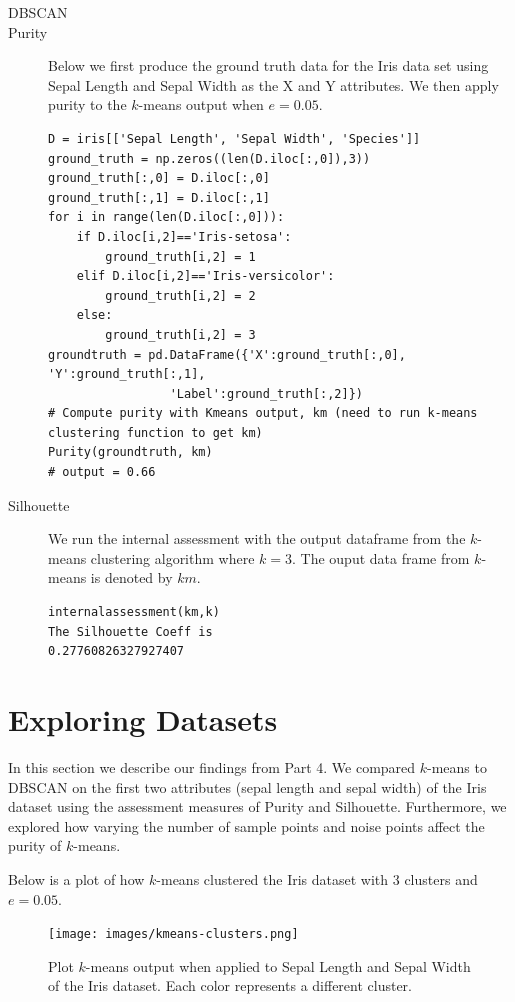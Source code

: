 \documentclass[psamsfonts,onesided,10pt]{amsart}
\begin{document}
\begin{description}
\item[DBSCAN] \todo{}
\item[Purity] Below we first produce the ground truth data for the Iris data set using Sepal Length 
and Sepal Width as the X and Y attributes. We then apply purity to the $k$-means output when $e=0.05$. 
\begin{verbatim}
D = iris[['Sepal Length', 'Sepal Width', 'Species']]
ground_truth = np.zeros((len(D.iloc[:,0]),3))
ground_truth[:,0] = D.iloc[:,0]
ground_truth[:,1] = D.iloc[:,1]
for i in range(len(D.iloc[:,0])):
    if D.iloc[i,2]=='Iris-setosa':
        ground_truth[i,2] = 1
    elif D.iloc[i,2]=='Iris-versicolor':
        ground_truth[i,2] = 2
    else:
        ground_truth[i,2] = 3
groundtruth = pd.DataFrame({'X':ground_truth[:,0], 'Y':ground_truth[:,1], 
                 'Label':ground_truth[:,2]})       
# Compute purity with Kmeans output, km (need to run k-means clustering function to get km)
Purity(groundtruth, km)
# output = 0.66
\end{verbatim}
\item[Silhouette] We run the internal assessment with the output dataframe from the 
$k$-means clustering algorithm where $k=3$. The ouput data frame from $k$-means is denoted by $km$.
\begin{verbatim}
internalassessment(km,k)
The Silhouette Coeff is 
0.27760826327927407
\end{verbatim}
\end{description}

\section{Exploring Datasets}
In this section we describe our findings from Part 4. We compared $k$-means to DBSCAN on the 
first two attributes (sepal length and sepal width) of the Iris dataset using the assessment 
measures of Purity and Silhouette. Furthermore, we explored 
how varying the number of sample points and noise points affect the purity of $k$-means. 

Below is a plot of how $k$-means clustered the Iris dataset with 3 clusters and $e=0.05$.
\begin{figure}[H]
    \centering
    {\texttt{[image: images/kmeans-clusters.png]}} \\
    \caption{Plot $k$-means output when applied to Sepal Length and Sepal Width of the Iris dataset. Each color represents a different cluster.}
\end{figure}
\end{document}
